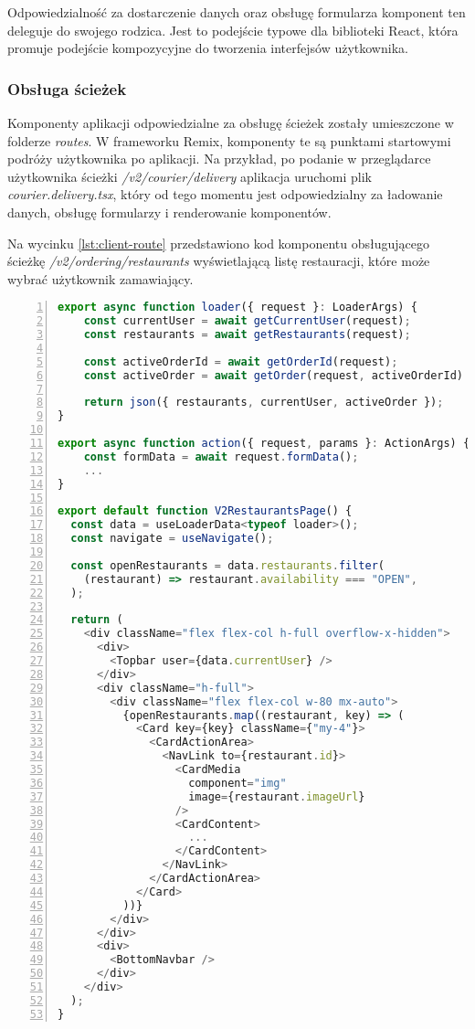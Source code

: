 Odpowiedzialność za dostarczenie danych oraz obsługę formularza komponent ten deleguje do swojego rodzica. Jest to podejście typowe dla biblioteki React, która promuje podejście kompozycyjne do tworzenia interfejsów użytkownika.

\subsubsection{Obsługa ścieżek}

Komponenty aplikacji odpowiedzialne za obsługę ścieżek zostały umieszczone w folderze \textit{routes}. W frameworku Remix, komponenty te są punktami startowymi podróży użytkownika po aplikacji. Na przykład, po podanie w przeglądarce użytkownika ścieżki \textit{/v2/courier/delivery} aplikacja uruchomi plik \textit{courier.delivery.tsx}, który od tego momentu jest odpowiedzialny za ładowanie danych, obsługę formularzy i renderowanie komponentów.

Na wycinku \ref{lst:client-route} przedstawiono kod komponentu obsługującego ścieżkę \textit{/v2/ordering/restaurants} wyświetlającą listę restauracji, które może wybrać użytkownik zamawiający.

\begin{lstlisting}[caption={Kod ścieżki wyświetlającej listę dostępnych restauracji - \textit{/v2/ordering/restaurants}},label={lst:client-route},captionpos=b,language=JavaScript,numbers=left,showstringspaces=false]
export async function loader({ request }: LoaderArgs) {
    const currentUser = await getCurrentUser(request);
    const restaurants = await getRestaurants(request);
  
    const activeOrderId = await getOrderId(request);
    const activeOrder = await getOrder(request, activeOrderId)
  
    return json({ restaurants, currentUser, activeOrder });
}

export async function action({ request, params }: ActionArgs) {
    const formData = await request.formData();
    ...
}

export default function V2RestaurantsPage() {
  const data = useLoaderData<typeof loader>();
  const navigate = useNavigate();

  const openRestaurants = data.restaurants.filter(
    (restaurant) => restaurant.availability === "OPEN",
  );

  return (
    <div className="flex flex-col h-full overflow-x-hidden">
      <div>
        <Topbar user={data.currentUser} />
      </div>
      <div className="h-full">
        <div className="flex flex-col w-80 mx-auto">
          {openRestaurants.map((restaurant, key) => (
            <Card key={key} className={"my-4"}>
              <CardActionArea>
                <NavLink to={restaurant.id}>
                  <CardMedia
                    component="img"
                    image={restaurant.imageUrl}
                  />
                  <CardContent>
                    ...
                  </CardContent>
                </NavLink>
              </CardActionArea>
            </Card>
          ))}
        </div>
      </div>
      <div>
        <BottomNavbar />
      </div>
    </div>
  );
}      
\end{lstlisting}
      
